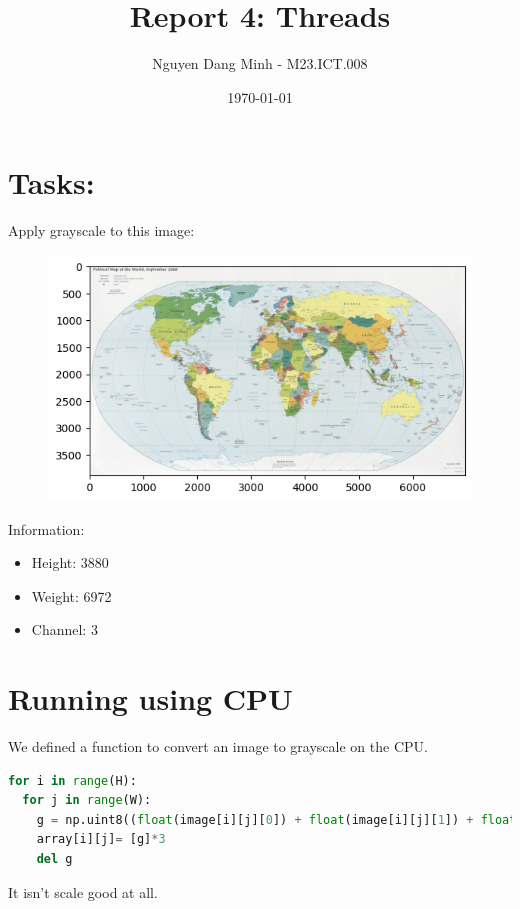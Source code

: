 \documentclass{article}
\title{Report 4: Threads}
\author{Nguyen Dang Minh - M23.ICT.008}
\date{\today}
\begin{document}
\maketitle
\section{Tasks:}

Apply grayscale to this image:

\begin{figure}[H]
    \centering
    \includegraphics[width=1\linewidth]{output.png}
\end{figure} 
Information: 
\begin{itemize}
    \item Height: 3880
    \item Weight: 6972
    \item Channel: 3
\end{itemize}


\section{Running using CPU}


We defined a function to convert an image to grayscale on the CPU. 
\begin{lstlisting}[language=Python]
for i in range(H):
  for j in range(W):
    g = np.uint8((float(image[i][j][0]) + float(image[i][j][1]) + float(image[i][j][2])) // 3)
    array[i][j]= [g]*3
    del g
\end{lstlisting}
It isn't scale good at all.
\end{document}
